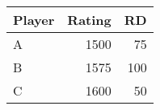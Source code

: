 \begin{tabular}{l r r}
	Player		& Rating & RD \\
	\hline
	A			& 1500 & 75 \\
	B			& 1575 & 100 \\
	C			& 1600 & 50 \\
\end{tabular}

